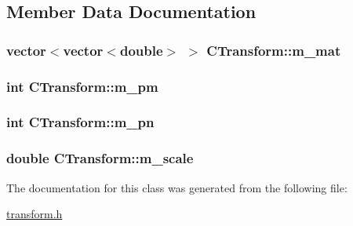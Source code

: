 \subsection{Member Data Documentation}
\hypertarget{classCTransform_ac57b548a5882b9da492184c88dbe364c}{
\subsubsection[{m\-\_\-mat}]{\setlength{\rightskip}{0pt plus 5cm}vector$<$vector$<$double$>$ $>$ C\-Transform\-::m\-\_\-mat\hspace{0.3cm}{\ttfamily [protected]}}}\label{classCTransform_ac57b548a5882b9da492184c88dbe364c}
\hypertarget{classCTransform_ad94510961771c7528f770330f2e66ad2}{
\subsubsection[{m\-\_\-pm}]{\setlength{\rightskip}{0pt plus 5cm}int C\-Transform\-::m\-\_\-pm\hspace{0.3cm}{\ttfamily [protected]}}}\label{classCTransform_ad94510961771c7528f770330f2e66ad2}
\hypertarget{classCTransform_aed813830606385011019c96b53cee18c}{
\subsubsection[{m\-\_\-pn}]{\setlength{\rightskip}{0pt plus 5cm}int C\-Transform\-::m\-\_\-pn\hspace{0.3cm}{\ttfamily [protected]}}}\label{classCTransform_aed813830606385011019c96b53cee18c}
\hypertarget{classCTransform_a3acf3a68d49e7535a4dd40a8a754def1}{
\subsubsection[{m\-\_\-scale}]{\setlength{\rightskip}{0pt plus 5cm}double C\-Transform\-::m\-\_\-scale\hspace{0.3cm}{\ttfamily [protected]}}}\label{classCTransform_a3acf3a68d49e7535a4dd40a8a754def1}


The documentation for this class was generated from the following file\-:\begin{DoxyCompactItemize}
\item 
\hyperlink{transform_8h}{transform.\-h}\end{DoxyCompactItemize}
